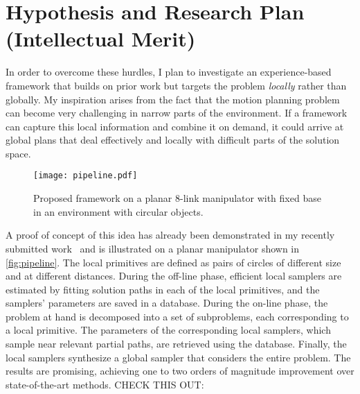 \documentclass[12pt]{article}
\begin{document}
\section{Hypothesis and Research Plan (Intellectual Merit)}
In order to overcome these hurdles, I plan to investigate an experience-based framework
that builds on prior work but targets the problem \textit{locally} rather than globally. My inspiration arises from the fact that the motion planning problem can become very challenging in narrow parts of the environment. 
If a framework can capture this local information and combine it on demand, it could arrive at global plans that deal effectively and locally with difficult parts of the solution space.

\begin{figure}
  \centering
  \texttt{[image: pipeline.pdf]}
  \caption{Proposed framework on a planar 8-link manipulator with  fixed base in an environment with circular objects.}  
  \label{fig:pipeline}
  \vspace{-1.2em}
\end{figure}

A proof of concept of this idea has already been demonstrated in my recently submitted work~\cite{Chamzas2019} and is illustrated on a planar manipulator shown in \autoref{fig:pipeline}. The local primitives are defined as pairs of circles of different size and at different distances. During the off-line phase, efficient local samplers are estimated by fitting solution paths in each of the local primitives, and the samplers' parameters are saved in a database. During the on-line phase, the problem at hand is decomposed into a set of subproblems, each corresponding to a local primitive. The parameters of the corresponding local samplers, which sample near relevant partial paths, are retrieved using the database. Finally, the local samplers synthesize a global sampler that considers the entire problem. The results are promising, achieving one to two orders of magnitude improvement over state-of-the-art methods.
CHECK THIS OUT:

\cite{kingston2021experience-foliations}

\cite{chamzas2021-learn-sampling}

\cite{moll2021hyperplan}

\cite{quintero-chamzas2021-motion-planning-in-the-dark}

\cite{pairet2021-path-planning-for-manipulation}

\cite{chamzas2020rep-learning}
\end{document}
